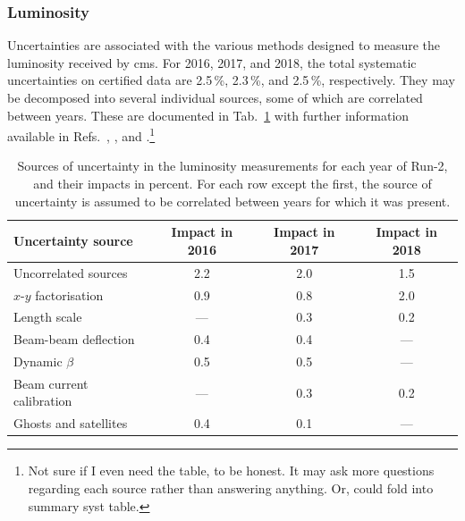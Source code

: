 \subsubsection{Luminosity}
\label{subsubsec:htoinv_lumi_syst}

Uncertainties are associated with the various methods designed to measure the luminosity received by \acrshort{cms}. For 2016, 2017, and 2018, the total systematic uncertainties on certified data are 2.5\,\%, 2.3\,\%, and 2.5\,\%, respectively. They may be decomposed into several individual sources, some of which are correlated between years. These are documented in Tab.~\ref{tab:lumi_systs} with further information available in Refs.~, , and .\footnote{Not sure if I even need the table, to be honest. It may ask more questions regarding each source rather than answering anything. Or, could fold into summary syst table.}

\begin{table}[htbp]
    \centering
    \begin{tabular}{lccc}
        \hline
        Uncertainty source & Impact in 2016 & Impact in 2017 & Impact in 2018 \\\hline
        Uncorrelated sources & 2.2 & 2.0 & 1.5 \\
        $x$-$y$ factorisation & 0.9 & 0.8 & 2.0 \\
        Length scale & --- & 0.3 & 0.2 \\
        Beam-beam deflection & 0.4 & 0.4 & --- \\
        Dynamic $\beta$ & 0.5 & 0.5 & --- \\
        Beam current calibration & --- & 0.3 & 0.2 \\
        Ghosts and satellites & 0.4 & 0.1 & ---  \\\hline
    \end{tabular}
    \caption[Sources of uncertainty in the luminosity measurements for each year of Run-2]{Sources of uncertainty in the luminosity measurements for each year of Run-2, and their impacts in percent. For each row except the first, the source of uncertainty is assumed to be correlated between years for which it was present.}
    \label{tab:lumi_systs}
\end{table}





